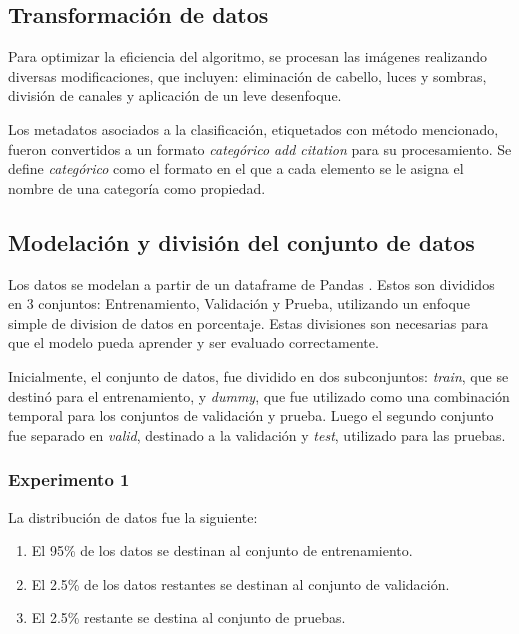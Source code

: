 \subsection{Transformación de datos}

Para optimizar la eficiencia del algoritmo, se procesan las imágenes realizando diversas modificaciones, que incluyen: eliminación de cabello, luces y sombras, división de canales y aplicación de un leve desenfoque.

Los metadatos asociados a la clasificación, etiquetados con método mencionado, fueron convertidos a un formato \textit{categórico} \textit{add citation} para su procesamiento. Se define \textit{categórico} como el formato en el que a cada elemento se le asigna el nombre de una categoría como propiedad.

\subsection{Modelación y división del conjunto de datos}

Los datos se modelan a partir de un dataframe de Pandas . Estos son divididos en 3 conjuntos: Entrenamiento, Validación y Prueba, utilizando un enfoque simple de division de datos en porcentaje. Estas divisiones son necesarias para que el modelo pueda aprender y ser evaluado correctamente.

Inicialmente, el conjunto de datos, fue dividido en dos subconjuntos: \textit{train}, que se destinó para el entrenamiento, y \textit{dummy}, que fue utilizado como una combinación temporal para los conjuntos de validación y prueba. Luego el segundo conjunto fue separado en \textit{valid}, destinado a la validación y \textit{test}, utilizado para las pruebas.

\subsubsection{Experimento 1}

   La distribución de datos fue la siguiente:

   \begin{enumerate}
      \item El 95\% de los datos se destinan al conjunto de entrenamiento.
      \item El 2.5\% de los datos restantes se destinan al conjunto de validación.
      \item El 2.5\% restante se destina al conjunto de pruebas.
   \end{enumerate}
   
